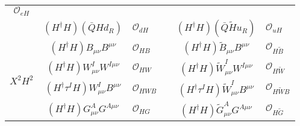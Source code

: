 \begin{table}
\begin{center}
\begin{tabular}{cclccl}
                                                                          $\mathcal{O}_{e H}$ & & \\
      &
        $(H^{\dagger} H)
        (\bar{Q} H d_R)$ &
                           $\mathcal{O}_{d H}$ &
                              &
                                $(H^{\dagger} H)
                                (\bar{Q} \tilde{H} u_R )$ &
                                                            $\mathcal{O}_{u H}$ \\[1mm]
      \midrule[0.25mm]
      \multirow{4}{*}{$X^2 H^2$} &
                                   $(H^\dagger H) B_{\mu\nu} B^{\mu\nu} $ &
                                                                            $\mathcal{O}_{H B}$ &
                              &
                                $(H^\dagger H) \tilde{B}_{\mu\nu} B^{\mu\nu}$ &
                                                                                $\mathcal{O}_{H \tilde{B}}$ \\
      &
        $(H^\dagger H) W_{\mu\nu}^I W^{I\mu\nu} $ &
                                                    $\mathcal{O}_{H W}$ &
                              &
                                $(H^\dagger H) \tilde{W}_{\mu\nu}^I W^{I\mu\nu}$ &
                                                                                   $\mathcal{O}_{H \tilde{W}}$ \\
      &
        $(H^\dagger \tau^I H) W^I_{\mu\nu} B^{\mu\nu}$ &
                                                         $\mathcal{O}_{H WB}$ &
                              &
                                $(H^\dagger \tau^I H) \tilde{W}^I_{\mu\nu} B^{\mu\nu}$ &
                                                                                         $\mathcal{O}_{H\tilde{W}B}$ \\
      &
        $(H^\dagger H) G_{\mu\nu}^A G^{A\mu\nu} $ &
                                                    $\mathcal{O}_{H G}$ &
                              &
                                $(H^\dagger H) \tilde{G}_{\mu\nu}^A G^{A\mu\nu}$ &
                                                                                   $\mathcal{O}_{H\tilde{G}}$ \\[1mm]

\end{tabular}
\end{center}
\end{table}
